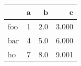 \begin{tabular}{lrrr}
\toprule
{} & a &   b &     c \\
\midrule
foo & 1 & 2.0 & 3.000 \\
bar & 4 & 5.0 & 6.000 \\
ho  & 7 & 8.0 & 9.001 \\
\bottomrule
\end{tabular}
